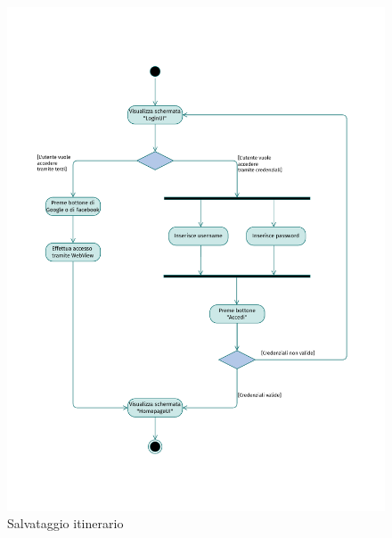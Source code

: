 \documentclass{natourDoc}
\begin{document}
\newpage
\begin{figure}[!htbp]
	\centering
	\includegraphics[width=\textwidth, page=12]{./diagrams/activity.pdf}
	\caption{Salvataggio itinerario}
\end{figure}
\FloatBarrier
\end{document}
